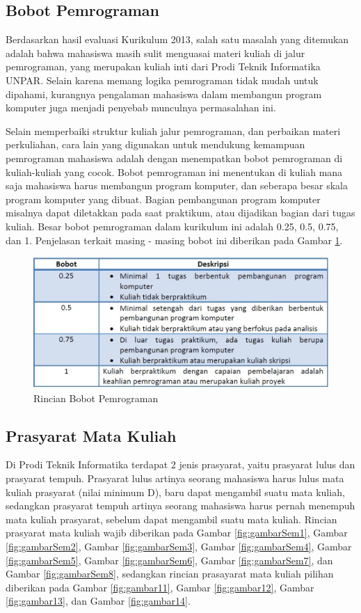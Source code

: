 \subsection{Bobot Pemrograman}
Berdasarkan hasil evaluasi Kurikulum 2013, salah satu masalah yang ditemukan adalah bahwa mahasiswa masih sulit menguasai materi kuliah di jalur pemrograman, yang merupakan kuliah inti dari Prodi Teknik Informatika UNPAR. Selain karena memang logika pemrograman tidak mudah untuk dipahami, kurangnya pengalaman mahasiswa dalam membangun program komputer juga menjadi penyebab munculnya permasalahan ini. \cite{kurikulum:2018}

Selain memperbaiki struktur kuliah jalur pemrograman, dan perbaikan materi perkuliahan, cara lain yang digunakan untuk mendukung kemampuan pemrograman mahasiswa adalah dengan menempatkan bobot pemrograman di kuliah-kuliah yang cocok. Bobot pemrograman ini menentukan di kuliah mana saja mahasiswa harus membangun program komputer, dan seberapa besar skala program komputer yang
dibuat. Bagian pembangunan program komputer misalnya dapat diletakkan pada saat praktikum, atau dijadikan bagian dari tugas kuliah.
\newpage
Besar bobot pemrograman dalam kurikulum ini adalah 0.25, 0.5, 0.75, dan 1. Penjelasan terkait masing - masing
bobot ini diberikan pada Gambar \ref{fig:gambar3}.

\begin{figure}[H]
    \centering
    \includegraphics[width=12cm, height=5cm]{Gambar/Bobot Pemorgraman .jpg}
    \caption{Rincian Bobot Pemrograman}
    \label{fig:gambar3}
\end{figure}

\subsection{Prasyarat Mata Kuliah}
Di Prodi Teknik Informatika terdapat 2 jenis prasyarat, yaitu prasyarat lulus dan prasyarat tempuh. Prasyarat lulus artinya seorang mahasiswa harus lulus mata kuliah prasyarat (nilai minimum D), baru dapat mengambil suatu mata kuliah, sedangkan prasyarat tempuh artinya seorang mahasiswa harus pernah menempuh mata kuliah prasyarat, sebelum dapat mengambil suatu mata kuliah. Rincian prasyarat mata kuliah wajib diberikan pada Gambar \ref{fig:gambarSem1}, Gambar \ref{fig:gambarSem2}, Gambar \ref{fig:gambarSem3}, Gambar \ref{fig:gambarSem4}, Gambar \ref{fig:gambarSem5}, Gambar \ref{fig:gambarSem6}, Gambar \ref{fig:gambarSem7}, dan Gambar \ref{fig:gambarSem8}, sedangkan rincian prasayarat mata kuliah pilihan diberikan pada Gambar \ref{fig:gambar11}, Gambar \ref{fig:gambar12}, Gambar \ref{fig:gambar13}, dan Gambar \ref{fig:gambar14}.

